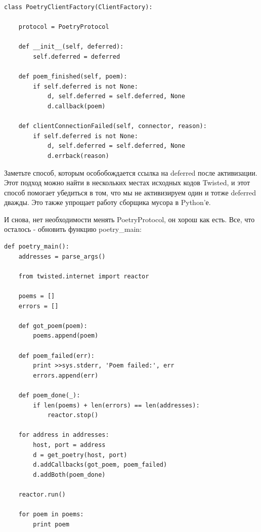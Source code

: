 \begin{scriptsize}\begin{verbatim}
class PoetryClientFactory(ClientFactory):

    protocol = PoetryProtocol

    def __init__(self, deferred):
        self.deferred = deferred

    def poem_finished(self, poem):
        if self.deferred is not None:
            d, self.deferred = self.deferred, None
            d.callback(poem)

    def clientConnectionFailed(self, connector, reason):
        if self.deferred is not None:
            d, self.deferred = self.deferred, None
            d.errback(reason)
\end{verbatim}\end{scriptsize}


Заметьте способ, которым особобождается ссылка на 
deferred после активизации. Этот подход можно найти 
в нескольких местах исходных кодов Twisted, и этот способ  
помогает убедиться в том, что мы не активизируем один и тотже 
deferred дважды. Это также упрощает работу сборщика мусора в Python'е.


И снова, нет необходимости менять PoetryProtocol, он хорош 
как есть. Все, что осталось - обновить функцию poetry\_main: 

\begin{scriptsize}\begin{verbatim}
def poetry_main():
    addresses = parse_args()

    from twisted.internet import reactor

    poems = []
    errors = []

    def got_poem(poem):
        poems.append(poem)

    def poem_failed(err):
        print >>sys.stderr, 'Poem failed:', err
        errors.append(err)

    def poem_done(_):
        if len(poems) + len(errors) == len(addresses):
            reactor.stop()

    for address in addresses:
        host, port = address
        d = get_poetry(host, port)
        d.addCallbacks(got_poem, poem_failed)
        d.addBoth(poem_done)

    reactor.run()

    for poem in poems:
        print poem
\end{verbatim}\end{scriptsize}


